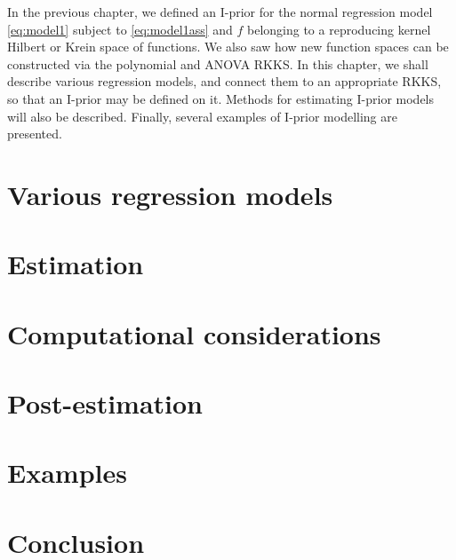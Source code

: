 \documentclass[a4paper,showframe,11pt]{report}
\begin{document}

In the previous chapter, we defined an I-prior for the normal regression model \eqref{eq:model1} subject to \eqref{eq:model1ass} and $f$ belonging to a reproducing kernel Hilbert or Krein space of functions.
We also saw how new function spaces can be constructed via the polynomial and ANOVA RKKS.
In this chapter, we shall describe various regression models, and connect them to an appropriate RKKS, so that an I-prior may be defined on it.
Methods for estimating I-prior models will also be described.
Finally, several examples of I-prior modelling are presented.

\section{Various regression models}\label{sec:various-regression}
%

\section{Estimation}


\section{Computational considerations}


\section{Post-estimation}


\section{Examples}
%

\section{Conclusion}
\end{document}
